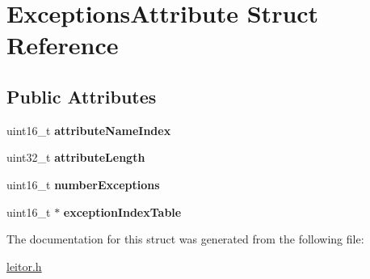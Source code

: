 \hypertarget{structExceptionsAttribute}{}\section{Exceptions\+Attribute Struct Reference}
\label{structExceptionsAttribute}
\subsection*{Public Attributes}
\begin{DoxyCompactItemize}
\item 
\mbox{\label{structExceptionsAttribute_a18fa6a96d9f0c1a55230e688d72b2a4c}} 
uint16\+\_\+t {\bfseries attribute\+Name\+Index}
\item 
\mbox{\label{structExceptionsAttribute_ab2bca3da1eb560c5c08449106ff85c54}} 
uint32\+\_\+t {\bfseries attribute\+Length}
\item 
\mbox{\label{structExceptionsAttribute_ae877887aa7835d6a65b2a9dcf313e849}} 
uint16\+\_\+t {\bfseries number\+Exceptions}
\item 
\mbox{\label{structExceptionsAttribute_a6e7edf18fe9cf9f9cae4e4aed16d0837}} 
uint16\+\_\+t $\ast$ {\bfseries exception\+Index\+Table}
\end{DoxyCompactItemize}


The documentation for this struct was generated from the following file\+:\begin{DoxyCompactItemize}
\item 
\hyperlink{leitor_8h}{leitor.\+h}\end{DoxyCompactItemize}

